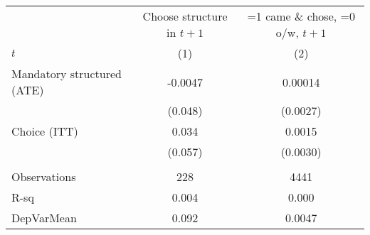 \begin{tabular}{lcc}
\toprule
      & Choose structure in $t+1$ & =1 came \& chose, =0 o/w, $t+1$ \\
\cmidrule{2-3}$t$   & (1)   & (2) \\
\midrule
\midrule
Mandatory structured (ATE) & -0.0047 & 0.00014 \\
      & (0.048) & (0.0027) \\
Choice  (ITT) & 0.034 & 0.0015 \\
      & (0.057) & (0.0030) \\
      &       &  \\
\midrule
Observations & 228   & 4441 \\
R-sq  & 0.004 & 0.000 \\
DepVarMean & 0.092 & 0.0047 \\
\bottomrule
\bottomrule
\end{tabular}%
